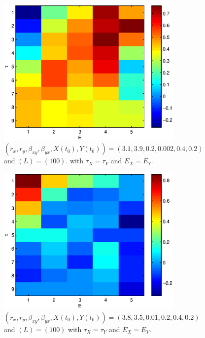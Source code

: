 \documentclass[a4paper,11pt]{article}
\begin{document}
\begin{figure}[h!t]
\centering
\begin{subfigure}[b]{0.4\textwidth}
\label{fig:SugEx2vEdimvTau}
\includegraphics[scale=0.55]{graphics/SugEx2vEdimvTau.eps}
\caption{ $\left(r_x,r_y,\beta_{xy},\beta_{yx},X(t_0),Y(t_0)\right) = \left(3.1,3.9,0.2,0.002,0.4,0.2\right)$ and $\left(L\right) = \left(100\right)$. with $\tau_X=\tau_Y$ and $E_X=E_Y$.}
\end{subfigure}
\begin{subfigure}[b]{0.4\textwidth}
\label{fig:SugEx1vEdimvTau}
\includegraphics[scale=0.55]{graphics/SugEx1vEdimvTau.eps}
\caption{ $\left(r_x,r_y,\beta_{xy},\beta_{yx},X(t_0),Y(t_0)\right) = \left(3.8,3.5,0.01,0.2,0.4,0.2\right)$ and $\left(L\right) = \left(100\right)$ with $\tau_X=\tau_Y$ and $E_X=E_Y$.}
\end{subfigure}
\caption{}
\end{figure}
\end{document}

